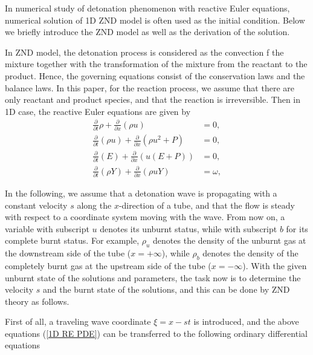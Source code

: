 \documentclass[preprint,12pt]{elsarticle}
\begin{document}
In numerical study of detonation phenomenon with reactive Euler equations,
numerical solution of 1D ZND model is often used as the initial condition.
Below we briefly introduce the ZND model as well as the derivation of the
solution.

In ZND model, the detonation process is considered as the convection
f the mixture together with the transformation of the mixture from
the reactant to the product. Hence, the governing equations consist of
the conservation laws and the balance laws. In this paper, for the
reaction process, we assume that there are only reactant and product
species, and that the reaction is irreversible. Then in 1D case, the
reactive Euler equations are given by
\begin{subequations}\label{1D RE PDE}
  \begin{align}
    \displaystyle\frac{\partial}{\partial t}\rho + \frac{\partial}{\partial x}(\rho u) &= 0,\label{1D RE PDE:a}\\
    \displaystyle\frac{\partial}{\partial t}(\rho u) + \frac{\partial}{\partial x}(\rho u^2 + P) &= 0,\label{1D RE PDE:b}\\
    \displaystyle\frac{\partial}{\partial t}(E) + \frac{\partial}{\partial
    x}(u(E + P)) &= 0,\label{1D RE PDE:c}\\
    \displaystyle\frac{\partial}{\partial t}(\rho Y) + \frac{\partial}{\partial x}(\rho u Y) &= \omega,\label{1D RE PDE:d}
  \end{align}
\end{subequations}

In the following, we assume that a detonation wave is propagating with a
constant velocity $s$ along the $x$-direction of a tube, and that the flow is
steady with respect to a coordinate system moving with the wave. From now on, a
variable with subscript $u$ denotes its unburnt status, while with subscript
$b$ for its complete burnt status. For example, $\rho_u$ denotes the density of
the unburnt gas at the downstream side of the tube ($x=+\infty$), while
$\rho_b$ denotes the density of the completely burnt gas at the upstream side
of the tube ($x = -\infty$). With the given unburnt state of the solutions and
parameters, the task now is to determine the velocity $s$ and the burnt state
of the solutions, and this can be done by ZND theory as follows.

First of all, a traveling wave coordinate $\xi = x - st$ is introduced, and the
above equations (\ref{1D RE PDE}) can be transferred to the following ordinary
differential equations
\end{document}
